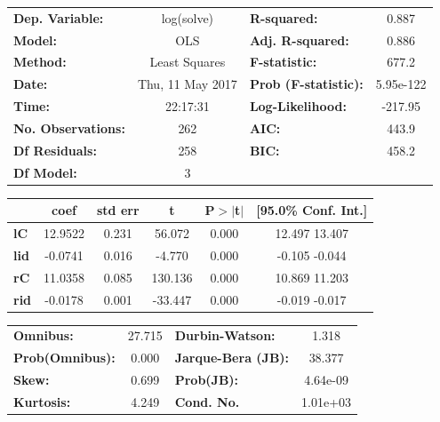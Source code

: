 \documentclass{article}
\begin{document}
\begin{center}
\begin{tabular}{lclc}
\toprule
\textbf{Dep. Variable:}    &    log(solve)    & \textbf{  R-squared:         } &     0.887   \\
\textbf{Model:}            &       OLS        & \textbf{  Adj. R-squared:    } &     0.886   \\
\textbf{Method:}           &  Least Squares   & \textbf{  F-statistic:       } &     677.2   \\
\textbf{Date:}             & Thu, 11 May 2017 & \textbf{  Prob (F-statistic):} & 5.95e-122   \\
\textbf{Time:}             &     22:17:31     & \textbf{  Log-Likelihood:    } &   -217.95   \\
\textbf{No. Observations:} &         262      & \textbf{  AIC:               } &     443.9   \\
\textbf{Df Residuals:}     &         258      & \textbf{  BIC:               } &     458.2   \\
\textbf{Df Model:}         &           3      & \textbf{                     } &             \\
\bottomrule
\end{tabular}
\begin{tabular}{lccccc}
             & \textbf{coef} & \textbf{std err} & \textbf{t} & \textbf{P$>$$|$t$|$} & \textbf{[95.0\% Conf. Int.]}  \\
\midrule
\textbf{lC}  &      12.9522  &        0.231     &    56.072  &         0.000        &        12.497    13.407       \\
\textbf{lid} &      -0.0741  &        0.016     &    -4.770  &         0.000        &        -0.105    -0.044       \\
\textbf{rC}  &      11.0358  &        0.085     &   130.136  &         0.000        &        10.869    11.203       \\
\textbf{rid} &      -0.0178  &        0.001     &   -33.447  &         0.000        &        -0.019    -0.017       \\
\bottomrule
\end{tabular}
\begin{tabular}{lclc}
\textbf{Omnibus:}       & 27.715 & \textbf{  Durbin-Watson:     } &    1.318  \\
\textbf{Prob(Omnibus):} &  0.000 & \textbf{  Jarque-Bera (JB):  } &   38.377  \\
\textbf{Skew:}          &  0.699 & \textbf{  Prob(JB):          } & 4.64e-09  \\
\textbf{Kurtosis:}      &  4.249 & \textbf{  Cond. No.          } & 1.01e+03  \\
\bottomrule
\end{tabular}
\end{center}
 
\end{document}
